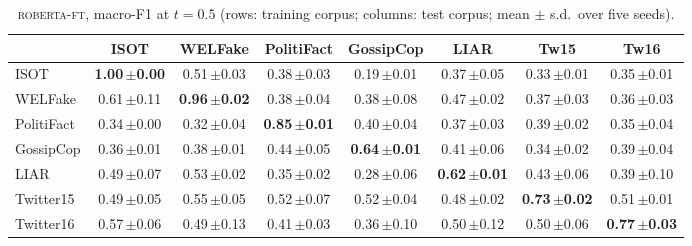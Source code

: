 \begin{table}[h]
\centering
\caption{\textsc{roberta-ft}, macro-F1 at $t=0.5$ (rows: training corpus; columns: test corpus; mean $\pm$ s.d.\ over five seeds).}
\scriptsize
\begin{tabular}{@{}lccccccc@{}}
\toprule
 & ISOT & WELFake & PolitiFact & GossipCop & LIAR & Tw15 & Tw16 \\
\midrule
ISOT & \textbf{1.00\,{\tiny$\pm$0.00}} & 0.51\,{\tiny$\pm$0.03} & 0.38\,{\tiny$\pm$0.03} & 0.19\,{\tiny$\pm$0.01} & 0.37\,{\tiny$\pm$0.05} & 0.33\,{\tiny$\pm$0.01} & 0.35\,{\tiny$\pm$0.01} \\
WELFake & 0.61\,{\tiny$\pm$0.11} & \textbf{0.96\,{\tiny$\pm$0.02}} & 0.38\,{\tiny$\pm$0.04} & 0.38\,{\tiny$\pm$0.08} & 0.47\,{\tiny$\pm$0.02} & 0.37\,{\tiny$\pm$0.03} & 0.36\,{\tiny$\pm$0.03} \\
PolitiFact & 0.34\,{\tiny$\pm$0.00} & 0.32\,{\tiny$\pm$0.04} & \textbf{0.85\,{\tiny$\pm$0.01}} & 0.40\,{\tiny$\pm$0.04} & 0.37\,{\tiny$\pm$0.03} & 0.39\,{\tiny$\pm$0.02} & 0.35\,{\tiny$\pm$0.04} \\
GossipCop & 0.36\,{\tiny$\pm$0.01} & 0.38\,{\tiny$\pm$0.01} & 0.44\,{\tiny$\pm$0.05} & \textbf{0.64\,{\tiny$\pm$0.01}} & 0.41\,{\tiny$\pm$0.06} & 0.34\,{\tiny$\pm$0.02} & 0.39\,{\tiny$\pm$0.04} \\
LIAR & 0.49\,{\tiny$\pm$0.07} & 0.53\,{\tiny$\pm$0.02} & 0.35\,{\tiny$\pm$0.02} & 0.28\,{\tiny$\pm$0.06} & \textbf{0.62\,{\tiny$\pm$0.01}} & 0.43\,{\tiny$\pm$0.06} & 0.39\,{\tiny$\pm$0.10} \\
Twitter15 & 0.49\,{\tiny$\pm$0.05} & 0.55\,{\tiny$\pm$0.05} & 0.52\,{\tiny$\pm$0.07} & 0.52\,{\tiny$\pm$0.04} & 0.48\,{\tiny$\pm$0.02} & \textbf{0.73\,{\tiny$\pm$0.02}} & 0.51\,{\tiny$\pm$0.01} \\
Twitter16 & 0.57\,{\tiny$\pm$0.06} & 0.49\,{\tiny$\pm$0.13} & 0.41\,{\tiny$\pm$0.03} & 0.36\,{\tiny$\pm$0.10} & 0.50\,{\tiny$\pm$0.12} & 0.50\,{\tiny$\pm$0.06} & \textbf{0.77\,{\tiny$\pm$0.03}} \\
\bottomrule
\end{tabular}
\end{table}
